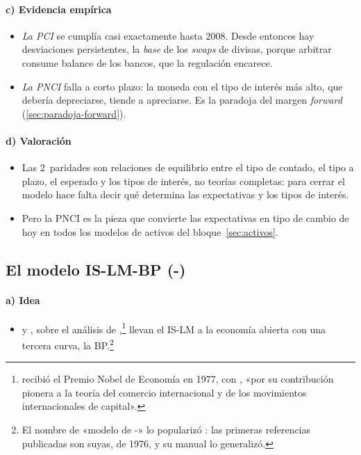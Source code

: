 \documentclass[11pt]{article}
\begin{document}
\paragraph{c) Evidencia empírica}
\begin{itemize}
\item \emph{La PCI} se cumplía casi exactamente hasta 2008. Desde entonces hay desviaciones persistentes, la \emph{base} de los \emph{swaps} de divisas, porque arbitrar consume balance de los bancos, que la regulación encarece\nocite{DuTepperVerdelhan2018Deviations}.
\item \emph{La PNCI} falla a corto plazo: la moneda con el tipo de interés más alto, que debería depreciarse, tiende a apreciarse. Es la paradoja del margen \emph{forward} (\ref{sec:paradoja-forward})\nocite{Fama1984Forward,FrootThaler1990}.
\end{itemize}

\paragraph{d) Valoración}
\begin{itemize}
\item Las 2~paridades son relaciones de equilibrio entre el tipo de contado, el tipo a plazo, el esperado y los tipos de interés, no teorías completas: para cerrar el modelo hace falta decir qué determina las expectativas y los tipos de interés.
\item Pero la PNCI es la pieza que convierte las expectativas en tipo de cambio de hoy en todos los modelos de activos del bloque~\ref{sec:activos}.
\end{itemize}

\subsection{El modelo IS-LM-BP (-)}\label{sec:mundell-fleming}

\paragraph{a) Idea}
\begin{itemize}
\item \textcite{Mundell1963Capital} y \textcite{Fleming1962Domestic}, sobre el análisis de \textcite{Meade1951},\footnote{ recibió el Premio Nobel de Economía en 1977, con , «por su contribución pionera a la teoría del comercio internacional y de los movimientos internacionales de capital»\nocite{Nobel1977MeadeOhlin}.} llevan el IS-LM a la economía abierta con una tercera curva, la BP.\footnote{El nombre de «modelo de -» lo popularizó : las primeras referencias publicadas son suyas, de 1976, y su manual lo generalizó\nocite{Boughton2003Origins,Dornbusch1976Policy}.}
\end{itemize}
\end{document}
